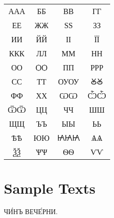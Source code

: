 \documentclass{article}
\begin{document}
{\fontsize{64pt}{2em}
\begin{tabular}{cccc}
	{\glyphfont А}{\simple А}{\salt А}	& {\glyphfont Б}{\simple Б} & {\glyphfont В}{\simple В} & {\glyphfont Г}{\simple Г} \\

	{\glyphfont Е}{\simple Е}	& {\glyphfont Ж}{\simple Ж} & {\glyphfont Ѕ}{\simple Ѕ} & {\glyphfont З}{\simple З} \\
	
	{\glyphfont И}{\simple И}	& {\glyphfont Й}{\simple Й} & {\glyphfont І}{\simple І} & {\glyphfont Ї}{\simple Ї} \\

	{\glyphfont К}{\simple К}{\salt К}	& {\glyphfont Л}{\simple Л} & {\glyphfont М}{\simple М} & {\glyphfont Н}{\simple Н} \\

	{\glyphfont О}{\simple О}	& {\glyphfont Ѻ}{\simple Ѻ} & {\glyphfont П}{\simple П} & {\glyphfont Р}{\simple Р}{\salt Р} \\

	{\glyphfont С}{\simple С}	& {\glyphfont Т}{\simple Т} & {\glyphfont ОУ}{\simple ОУ} & {\glyphfont Ꙋ}{\simple Ꙋ} \\

	{\glyphfont Ф}{\simple Ф}	& {\glyphfont Х}{\simple Х} & {\glyphfont Ѡ}{\simple Ѡ} & {\glyphfont Ѽ}{\simple Ѽ} \\

	{\glyphfont Ѿ}{\simple Ѿ}	& {\glyphfont Ц}{\simple Ц} & {\glyphfont Ч}{\simple Ч} & {\glyphfont Ш}{\simple Ш} \\

	{\glyphfont Щ}{\simple Щ}	& {\glyphfont Ъ}{\simple Ъ} & {\glyphfont Ы}{\simple Ы} & {\glyphfont Ь}{\simple Ь} \\

	{\glyphfont Ѣ}{\simple Ѣ}	& {\glyphfont Ю}{\simple Ю} & {\glyphfont Ꙗ}{\simple Ꙗ}{\salt Ꙗ} & {\glyphfont Ѧ}{\simple Ѧ} \\

	{\glyphfont Ѯ}{\simple Ѯ}	& {\glyphfont Ѱ}{\simple Ѱ} & {\glyphfont Ѳ}{\simple Ѳ} & {\glyphfont Ѵ}{\simple Ѵ} \\
\end{tabular}
}

\section{Sample Texts}

{\fontsize{64pt}{2em} \glyphfont ЧИ́НЪ ВЕЧЕ́РНИ.} \\
\end{document}
